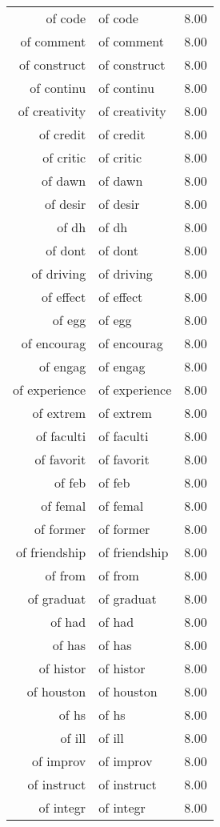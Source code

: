\begin{table}[ht]
\begin{tabular}{rlr}
  of code & of code & 8.00 \\ 
  of comment & of comment & 8.00 \\ 
  of construct & of construct & 8.00 \\ 
  of continu & of continu & 8.00 \\ 
  of creativity & of creativity & 8.00 \\ 
  of credit & of credit & 8.00 \\ 
  of critic & of critic & 8.00 \\ 
  of dawn & of dawn & 8.00 \\ 
  of desir & of desir & 8.00 \\ 
  of dh & of dh & 8.00 \\ 
  of dont & of dont & 8.00 \\ 
  of driving & of driving & 8.00 \\ 
  of effect & of effect & 8.00 \\ 
  of egg & of egg & 8.00 \\ 
  of encourag & of encourag & 8.00 \\ 
  of engag & of engag & 8.00 \\ 
  of experience & of experience & 8.00 \\ 
  of extrem & of extrem & 8.00 \\ 
  of faculti & of faculti & 8.00 \\ 
  of favorit & of favorit & 8.00 \\ 
  of feb & of feb & 8.00 \\ 
  of femal & of femal & 8.00 \\ 
  of former & of former & 8.00 \\ 
  of friendship & of friendship & 8.00 \\ 
  of from & of from & 8.00 \\ 
  of graduat & of graduat & 8.00 \\ 
  of had & of had & 8.00 \\ 
  of has & of has & 8.00 \\ 
  of histor & of histor & 8.00 \\ 
  of houston & of houston & 8.00 \\ 
  of hs & of hs & 8.00 \\ 
  of ill & of ill & 8.00 \\ 
  of improv & of improv & 8.00 \\ 
  of instruct & of instruct & 8.00 \\ 
  of integr & of integr & 8.00 \\ 

\end{tabular}
\end{table}
